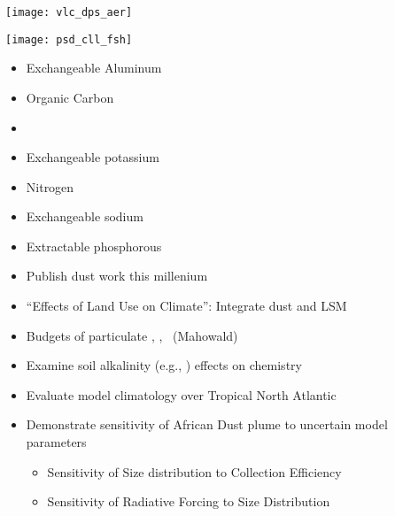 \documentclass[final,dvips]{foils}
\begin{document}
\rotatefoilhead{
\Large\textcolor{blue}{\hfill Size Sensitivity of Dry Deposition \hfill}}\vspace{-0.5in}\large
\begin{figure*}
\centering %
\texttt{[image: vlc\_dps\_aer]}%
\end{figure*}

\rotatefoilhead{
\Large\textcolor{blue}{\hfill Size Sensitivity of Collision Efficiency \hfill}}\vspace{-0.5in}\large
\begin{figure*}
\centering %
\texttt{[image: psd\_cll\_fsh]}%
\end{figure*}

\rotatefoilhead{\bgl\Large\textcolor{blue}{\hfill IGBP DIS Soil Mineralogy \hfill}}\large\vspace{-0.5in}
\enlargethispage*{1in} 
\begin{itemize}
\item Exchangeable Aluminum
\item Organic Carbon
\item \CaCOt
\item Exchangeable potassium
\item Nitrogen
\item Exchangeable sodium 
\item Extractable phosphorous
\end{itemize}

\rotatefoilhead{\bgl\Large\textcolor{blue}{\hfill BGC Directions \hfill}}\large\vspace{-0.5in} 
\enlargethispage*{1in} 
\begin{itemize}
\item Publish dust work this millenium
\item ``Effects of Land Use on Climate'': Integrate dust and LSM 
\item Budgets of particulate \C, \N, \Pu\ (Mahowald) 
\item Examine soil alkalinity (e.g., \CaCOt) effects on chemistry
\end{itemize}

\rotatefoilhead{\bgl\Large\textcolor{blue}{\hfill Objectives \hfill}}\large\vspace{-0.5in} 
\enlargethispage*{1in} 
\begin{itemize}
\item Evaluate model climatology over Tropical North Atlantic
\item Demonstrate sensitivity of African Dust plume to 
uncertain model parameters 
\begin{itemize}
\item Sensitivity of Size distribution to Collection Efficiency
\item Sensitivity of Radiative Forcing to Size Distribution
\end{itemize}
\end{itemize}
\end{document}
